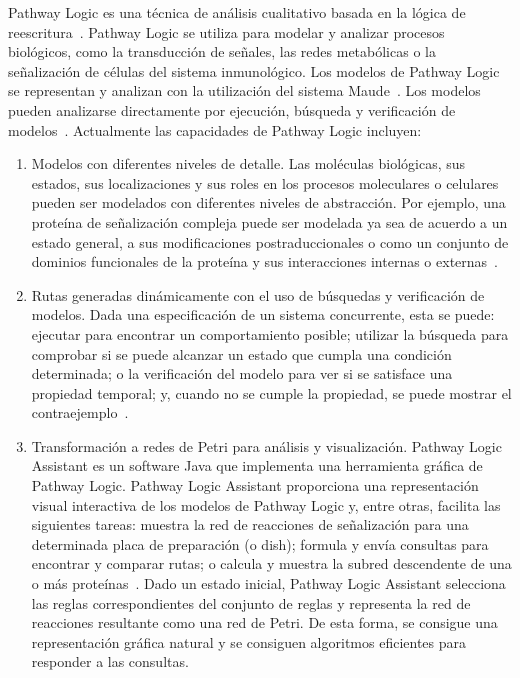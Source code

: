 Pathway Logic es una técnica de análisis cualitativo basada en la lógica de reescritura~\citep{sfm/Talcott08}. Pathway Logic se utiliza para modelar y analizar procesos biológicos, como la transducción de señales, las redes metabólicas o la señalización de células del sistema inmunológico. Los modelos de Pathway Logic se representan y analizan con la utilización del sistema Maude~\citep{maude2007,DBLP:conf/bibm/Talcott16}. Los modelos pueden analizarse directamente por ejecución, búsqueda y verificación de modelos~\citep{DBLP:journals/tcsb/TalcottD06,csb/TalcottEKLL03,DBLP:conf/cmsb/TalcottK17}. Actualmente las capacidades de Pathway Logic incluyen:

\begin{enumerate}
\item Modelos con diferentes niveles de detalle. Las moléculas biológicas, sus estados, sus localizaciones y sus roles en los procesos moleculares o celulares pueden ser modelados con diferentes niveles de abstracción. Por ejemplo, una proteína de señalización compleja puede ser modelada ya sea de acuerdo a un estado general, a sus modificaciones postraduccionales o como un conjunto de dominios funcionales de la proteína y sus interacciones internas o externas~\citep{DBLP:journals/entcs/EkerKLLT02}.
\item Rutas generadas dinámicamente con el uso de búsquedas y verificación de modelos. Dada una especificación de un sistema concurrente, esta se puede: ejecutar para encontrar un comportamiento posible; utilizar la búsqueda para comprobar si se puede alcanzar un estado que cumpla una condición determinada; o la verificación del modelo para ver si se satisface una propiedad temporal; y, cuando no se cumple la propiedad, se puede mostrar el contraejemplo~\citep{DBLP:conf/csb/KnappBELPTL05}. 
\item Transformación a redes de Petri para análisis y visualización. Pathway Logic Assistant es un software Java que implementa una herramienta gráfica de Pathway Logic. Pathway Logic Assistant proporciona una representación visual interactiva de los modelos de Pathway Logic y, entre otras, facilita las siguientes tareas: muestra la red de reacciones de señalización para una determinada placa de preparación (o dish); formula y envía consultas para encontrar y comparar rutas; o calcula y muestra la subred descendente de una o más proteínas~\citep{talcott-dill-05cmsb}. Dado un estado inicial, Pathway Logic Assistant selecciona las reglas correspondientes del conjunto de reglas y representa la red de reacciones resultante como una red de Petri. De esta forma, se consigue una representación gráfica natural y se consiguen algoritmos eficientes para responder a las consultas.
\end{enumerate}


